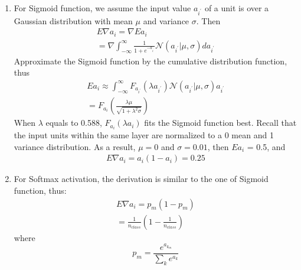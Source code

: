 \documentclass{sig-alternate}
\begin{document}
\begin{enumerate}
        \item For Sigmoid function, we assume the input value $a_{i^{'}}$ of a unit is over a Gaussian distribution with mean $\mu$ and variance $\sigma$. Then 
            \begin{equation}
                \begin{aligned}
                E\nabla a_i = \nabla Ea_i\\
                = \nabla\int_{-\infty}^{\infty}\frac{1}{1+e^{-a_{i^{'}}}}\mathcal{N}(a_{i^{'}}|\mu, \sigma)da_{i^{'}}
                \end{aligned}
            \end{equation}
            Approximate the Sigmoid function by the cumulative distribution function, thus
            \begin{equation}
                \begin{aligned}
                Ea_i \approx \int_{-\infty}^{\infty}F_{a_{i^{'}}}(\lambda a_{i^{'}})\mathcal{N}(a_{i^{'}}|\mu, \sigma)a_{i^{'}}\\
                = F_{a_i}(\frac{\lambda\mu}{\sqrt{1+\lambda^{2}\sigma}})
                \end{aligned}
            \end{equation}
            When $\lambda$ equals to 0.588, $F_{a_i}(\lambda a_i)$ fits the Sigmoid function best. Recall that the input units within the same layer are normalized to a 0 mean and 1 variance distribution. As a result, $\mu = 0$ and $\sigma = 0.01$, then $Ea_i$ = 0.5, and
            \begin{equation}
                \begin{aligned}
                    E\nabla a_i = a_i(1-a_i) = 0.25
                \end{aligned}
            \end{equation}
        \item For Softmax activation, the derivation is similar to the one of Sigmoid function, thus:
            \begin{equation}
                \begin{aligned}
                E\nabla a_i = p_m(1-p_m)\\ = \frac{1}{n_{class}}(1-\frac{1}{n_{class}})
                \end{aligned}
            \end{equation}
            where 
            \begin{equation}
                p_m = \frac{e^{a_{k_m}}}{\sum_ke^{a_k}}
            \end{equation}

    \end{enumerate}
\end{document}
